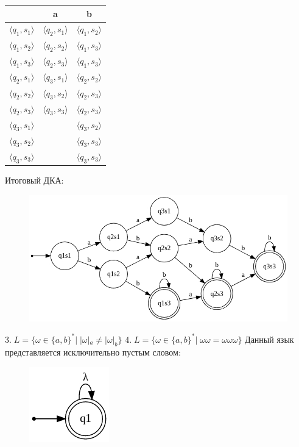 \documentclass[a4paper,12pt]{article}
\begin{document}
\begin{center}
\begin{tabular}{ |c|c|c| } 
\hline
  & a & b \\ [0.5ex] 
 \hline
 $\langle q_1 , s_1 \rangle$ & $\langle q_2 , s_1 \rangle$ & $\langle q_1 , s_2 \rangle$ \\ 
 $\langle q_1 , s_2 \rangle $ & $\langle q_2 , s_2 \rangle$ & $\langle q_1 , s_3 \rangle$ \\ 
 $\langle q_1 , s_3 \rangle $ & $\langle q_2 , s_3 \rangle$ & $\langle q_1 , s_3 \rangle$ \\ 
 $\langle q_2 , s_1 \rangle $ & $\langle q_3 , s_1 \rangle$ & $\langle q_2 , s_2 \rangle$ \\ 
 $\langle q_2 , s_2 \rangle $ & $\langle q_3 , s_2 \rangle$ & $\langle q_2 , s_3 \rangle$ \\
 $\langle q_2 , s_3 \rangle $ & $\langle q_3 , s_3 \rangle$ & $\langle q_2 , s_3 \rangle$ \\
 $\langle q_3 , s_1 \rangle $ &  & $\langle q_3 , s_2 \rangle$ \\
 $\langle q_3 , s_2 \rangle $ &  & $\langle q_3 , s_3 \rangle$ \\
 $\langle q_3 , s_3 \rangle $ &  & $\langle q_3 , s_3 \rangle$ \\
 \hline
\end{tabular}
\end{center}
\endgroup
Итоговый ДКА:\newline
\begin{figure}[h]
\centering
\includegraphics[scale=0.6]{1_2_3}
\end{figure}\newline
$3.\;L = {\{\omega \in \{a,b\}^*|\;|\omega|_a \ne |\omega|_b\}}$\newline
$4.\;L = {\{\omega \in \{a,b\}^*|\;\omega\omega = \omega\omega\omega \}}$\newline
Данный язык представляется исключительно пустым словом: \newline
\begin{figure}[h]
\centering
\includegraphics[scale=0.75]{1_4}
\end{figure}\newline
\end{document}
